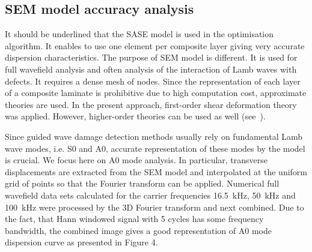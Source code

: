 \documentclass[preprint,12pt]{elsarticle}
\begin{document}
\subsection{SEM model accuracy analysis}
It should be underlined that the SASE model is used in the optimisation algorithm. 
It enables to use one element per composite layer giving very accurate dispersion characteristics. The purpose of SEM model is different. 
It is used for full wavefield analysis and often analysis of the interaction of Lamb waves with defects. 
It requires a dense mesh of nodes. 
Since the representation of each layer of a composite laminate is prohibitive due to high computation cost, approximate theories are used. 
In the present approach, first-order shear deformation theory was applied. 
However, higher-order theories can be used as well (see~\cite{Ostachowicz2012}).

Since guided wave damage detection methods usually rely on fundamental Lamb wave modes, i.e. S0 and A0, accurate representation of these modes by the model is crucial.
We focus here on A0 mode analysis. 
In particular, transverse displacements are extracted from the SEM model and interpolated at the uniform grid of points so that the Fourier transform can be applied. 
Numerical full wavefield data sets calculated for the carrier frequencies 16.5~kHz, 50~kHz and 100~kHz were processed by the 3D Fourier transform and next combined. 
Due to the fact, that Hann windowed signal with 5 cycles has some frequency bandwidth, the combined image gives a good representation of A0 mode dispersion curve as presented in Figure 4. 
\end{document}
